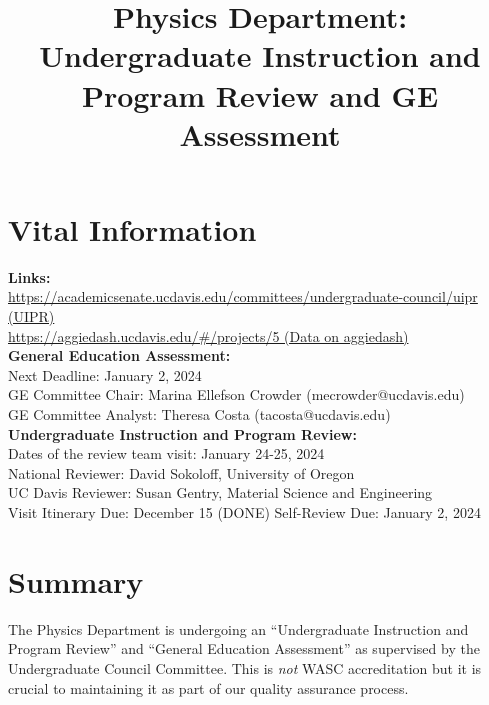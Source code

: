 \documentclass[12pt]{article}
\begin{document}

\title{Physics Department: Undergraduate Instruction and Program Review and GE Assessment}

\maketitle

\section{Vital Information}

\noindent
{\bf Links:}\\
\href{https://academicsenate.ucdavis.edu/committees/undergraduate-council/uipr}{https://academicsenate.ucdavis.edu/committees/undergraduate-council/uipr (UIPR)}\\
\href{https://aggiedash.ucdavis.edu/\#/projects/5}{
https://aggiedash.ucdavis.edu/\#/projects/5 (Data on aggiedash)}\\
  
\noindent
{\bf General Education Assessment:}\\
Next Deadline: January 2, 2024\\
GE Committee Chair: Marina Ellefson Crowder (mecrowder@ucdavis.edu)\\
GE Committee Analyst: Theresa Costa (tacosta@ucdavis.edu)\\

\noindent
{\bf Undergraduate Instruction and Program Review:}\\
Dates of the review team visit: January 24-25, 2024\\
National Reviewer: David Sokoloff, University of Oregon\\
UC Davis Reviewer: Susan Gentry, Material Science and Engineering\\
Visit Itinerary Due: December 15 (DONE)
Self-Review Due:  January 2, 2024 

\section{Summary}

The Physics Department is undergoing an ``Undergraduate Instruction and Program Review'' and ``General Education Assessment'' as supervised by the Undergraduate Council Committee.  This is {\em not} WASC accreditation but it is crucial to maintaining it as part of our quality assurance process.\\[8pt]
\end{document}
